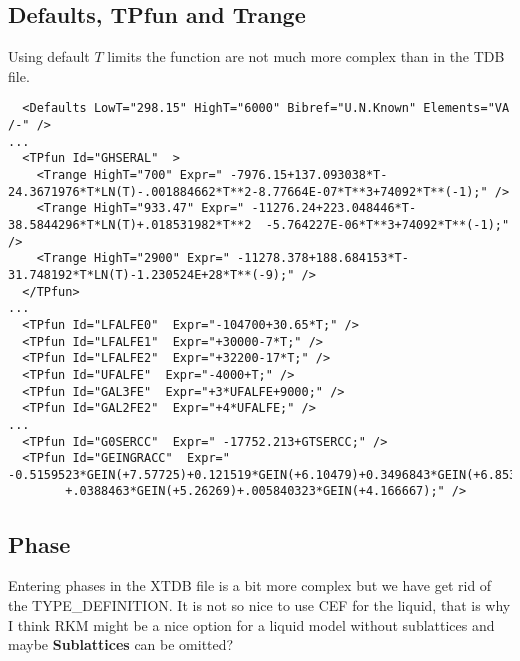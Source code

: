 \documentclass{article}
\begin{document}
\begin{appendices}
\subsection{Defaults, TPfun and Trange}\label{sec:tpfuns}

Using default $T$ limits the function are not much more complex than
in the TDB file.

{\small
\begin{verbatim}
  <Defaults LowT="298.15" HighT="6000" Bibref="U.N.Known" Elements="VA /-" />
...
  <TPfun Id="GHSERAL"  >
    <Trange HighT="700" Expr=" -7976.15+137.093038*T-24.3671976*T*LN(T)-.001884662*T**2-8.77664E-07*T**3+74092*T**(-1);" />
    <Trange HighT="933.47" Expr=" -11276.24+223.048446*T-38.5844296*T*LN(T)+.018531982*T**2  -5.764227E-06*T**3+74092*T**(-1);" />
    <Trange HighT="2900" Expr=" -11278.378+188.684153*T-31.748192*T*LN(T)-1.230524E+28*T**(-9);" />
  </TPfun>
...
  <TPfun Id="LFALFE0"  Expr="-104700+30.65*T;" />
  <TPfun Id="LFALFE1"  Expr="+30000-7*T;" />
  <TPfun Id="LFALFE2"  Expr="+32200-17*T;" />
  <TPfun Id="UFALFE"  Expr="-4000+T;" />
  <TPfun Id="GAL3FE"  Expr="+3*UFALFE+9000;" />
  <TPfun Id="GAL2FE2"  Expr="+4*UFALFE;" />
...
  <TPfun Id="G0SERCC"  Expr=" -17752.213+GTSERCC;" /> 
  <TPfun Id="GEINGRACC"  Expr=" -0.5159523*GEIN(+7.57725)+0.121519*GEIN(+6.10479)+0.3496843*GEIN(+6.8533)
        +.0388463*GEIN(+5.26269)+.005840323*GEIN(+4.166667);" /> 
\end{verbatim}
}

\subsection{Phase}\label{sec:phaseexample}

Entering phases in the XTDB file is a bit more complex but we have get
rid of the TYPE\_DEFINITION.  It is not so nice to use CEF for the
liquid, that is why I think RKM might be a nice option for a liquid
model without sublattices and maybe {\bf Sublattices} can be omitted?


\end{appendices}
\end{document}
